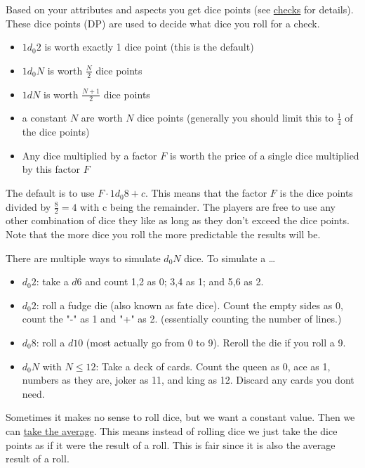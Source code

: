 \documentclass[11pt]{article}
\begin{document}
{Based on your attributes and aspects you get dice points (see \hyperref[sec:orga558452]{checks} for details). These dice points (DP) are used to decide what dice you roll for a check. 

\begin{itemize}
\item \(1 d_0 2\) is worth exactly 1 dice point (this is the default)
\item \(1 d_0 N\) is worth \(\frac{N}{2}\) dice points
\item \(1 d N\) is worth \(\frac{N+1}{2}\) dice points
\item a constant \(N\) are worth \(N\) dice points (generally you should limit this to \(\frac{1}{4}\) of the dice points)
\item Any dice multiplied by a factor \(F\) is worth the price of a single dice multiplied by this factor \(F\)
\end{itemize}

The default is to use \(F \cdot 1 d_0 8 + c\). This means that the factor \(F\) is the dice points divided by \(\frac{8}{2} = 4\) with c being the remainder. The players are free to use any other combination of dice they like as long as they don't exceed the dice points. Note that the more dice you roll the more predictable the results will be.

There are multiple ways to simulate \(d_0 N\) dice. To simulate a \ldots{}
\begin{itemize}
\item \(d_0 2\): take a \(d6\) and count 1,2 as 0; 3,4 as 1; and 5,6 as 2.
\item \(d_0 2\): roll a fudge die (also known as fate dice). Count the empty sides as 0, count the "-" as 1 and "+" as 2. (essentially counting the number of lines.)
\item \(d_0 8\): roll a \(d10\) (most actually go from 0 to 9). Reroll the die if you roll a 9.
\item \(d_0 N\) with \(N \le 12\): Take a deck of cards. Count the queen as 0, ace as 1, numbers as they are, joker as 11, and king as 12. Discard any cards you dont need.
\end{itemize}

Sometimes it makes no sense to roll dice, but we want a constant value. Then we can \hyperref[sec:orgdbbeacb]{take the average}. This means instead of rolling dice we just take the dice points as if it were the result of a roll. This is fair since it is also the average result of a roll.


}
\end{document}
